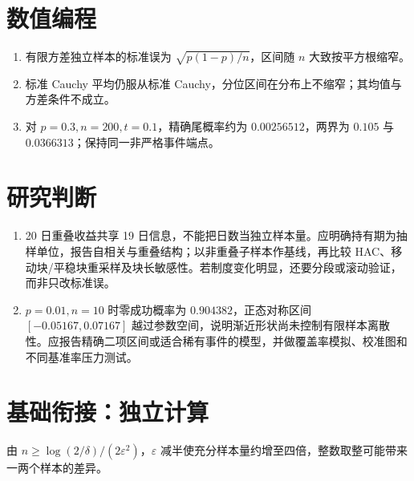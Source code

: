\section*{数值编程}
\begin{enumerate}[leftmargin=*]
  \item 有限方差独立样本的标准误为 $\sqrt{p(1-p)/n}$，区间随 $n$ 大致按平方根缩窄。
  \item 标准 Cauchy 平均仍服从标准 Cauchy，分位区间在分布上不缩窄；其均值与方差条件不成立。
  \item 对 $p=0.3,n=200,t=0.1$，精确尾概率约为 $0.00256512$，两界为 $0.105$ 与 $0.0366313$；保持同一非严格事件端点。
\end{enumerate}

\section*{研究判断}
\begin{enumerate}[leftmargin=*]
  \item 20 日重叠收益共享 19 日信息，不能把日数当独立样本量。应明确持有期为抽样单位，报告自相关与重叠结构；以非重叠子样本作基线，再比较 HAC、移动块/平稳块重采样及块长敏感性。若制度变化明显，还要分段或滚动验证，而非只改标准误。
  \item $p=0.01,n=10$ 时零成功概率为 $0.904382$，正态对称区间 $[-0.05167,0.07167]$ 越过参数空间，说明渐近形状尚未控制有限样本离散性。应报告精确二项区间或适合稀有事件的模型，并做覆盖率模拟、校准图和不同基准率压力测试。
\end{enumerate}


\MFQMappedUpperChNineSolutions

\section*{基础衔接：独立计算}
由 $n\geq\log(2/\delta)/(2\varepsilon^2)$，$\varepsilon$ 减半使充分样本量约增至四倍，整数取整可能带来一两个样本的差异。
